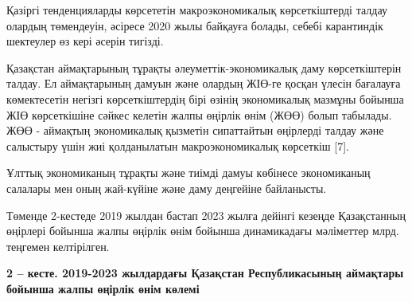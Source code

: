 \begin{multicols}{2}
Қазіргі тенденцияларды көрсететін макроэкономикалық көрсеткіштерді
талдау олардың төмендеуін, әсіресе 2020 жылы байқауға болады, себебі
карантиндік шектеулер өз кері әсерін тигізді.

Қазақстан аймақтарының тұрақты әлеуметтік-экономикалық даму
көрсеткіштерін талдау. Ел аймақтарының дамуын және олардың ЖІӨ-ге қосқан
үлесін бағалауға көмектесетін негізгі көрсеткіштердің бірі өзінің
экономикалық мазмұны бойынша ЖІӨ көрсеткішіне сәйкес келетін жалпы
өңірлік өнім (ЖӨӨ) болып табылады. ЖӨӨ - аймақтың экономикалық қызметін
сипаттайтын өңірлерді талдау және салыстыру үшін жиі қолданылатын
макроэкономикалық көрсеткіш {[}7{]}.

Ұлттық экономиканың тұрақты және тиімді дамуы көбінесе экономиканың
салалары мен оның жай-күйіне және даму деңгейіне байланысты.

Төменде 2-кестеде 2019 жылдан бастап 2023 жылға дейінгі кезеңде
Қазақстанның өңірлері бойынша жалпы өңірлік өнім бойынша динамикадағы
мәліметтер млрд. теңгемен келтірілген.
\end{multicols}

{\bfseries 2 -- кесте. 2019-2023 жылдардағы Қазақстан Республикасының
аймақтары бойынша жалпы өңірлік өнім көлемі}

